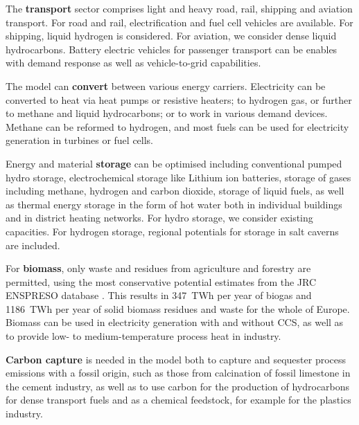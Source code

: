 The \textbf{transport} sector comprises light and heavy road, rail, shipping and
aviation transport. For road and rail, electrification and fuel cell vehicles are
available. For shipping, liquid hydrogen is considered. For aviation, we
consider dense liquid hydrocarbons. Battery electric vehicles for passenger
transport can be enables with demand response as well as vehicle-to-grid
capabilities.

The model can \textbf{convert} between various energy carriers. Electricity can
be converted to heat via heat pumps or resistive heaters; to hydrogen gas, or
further to methane and liquid hydrocarbons; or to work in various demand
devices. Methane can be reformed to hydrogen, and most fuels can be used for
electricity generation in turbines or fuel cells.

Energy and material \textbf{storage} can be optimised including conventional
pumped hydro storage, electrochemical storage like Lithium ion batteries,
storage of gases including methane, hydrogen and carbon dioxide, storage of
liquid fuels, as well as thermal energy storage in the form of hot water both in
individual buildings and in district heating networks. For hydro storage, we
consider existing capacities. For hydrogen storage, regional potentials for
storage in salt caverns are included.

For \textbf{biomass}, only waste and residues from agriculture and forestry are
permitted, using the most conservative potential estimates from the JRC ENSPRESO
database \cite{jrcbiomass2015}. This results in 347~TWh per year of biogas and
1186~TWh per year of solid biomass residues and waste for the whole of Europe.
Biomass can be used in electricity generation with and without CCS, as well as
to provide low- to medium-temperature process heat in industry.

\textbf{Carbon capture} is needed in the model both to capture and sequester
process emissions with a fossil origin, such as those from calcination of fossil
limestone in the cement industry, as well as to use carbon for the
production of hydrocarbons for dense transport fuels and as a chemical
feedstock, for example for the plastics industry.